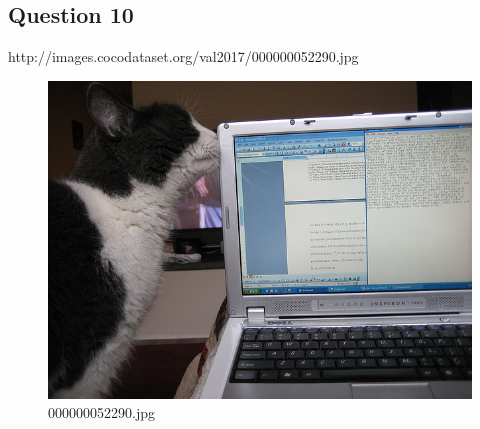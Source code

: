 \subsection*{Question 10}
http://images.cocodataset.org/val2017/000000052290.jpg
    \begin{figure}[h]
        \centering
        \includegraphics[width=0.8\linewidth]{../image set/easy/000000052290.jpg}
        \caption{000000052290.jpg}
    \end{figure}

